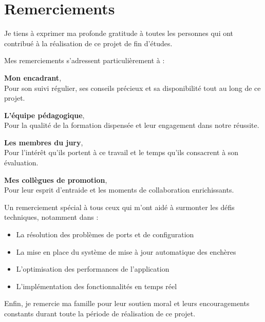 \chapter*{Remerciements}

\vspace{1cm}

Je tiens à exprimer ma profonde gratitude à toutes les personnes qui ont contribué à la réalisation de ce projet de fin d'études.

\vspace{0.5cm}

Mes remerciements s'adressent particulièrement à :

\vspace{0.5cm}

\textbf{Mon encadrant},\\
Pour son suivi régulier, ses conseils précieux et sa disponibilité tout au long de ce projet.

\vspace{0.5cm}

\textbf{L'équipe pédagogique},\\
Pour la qualité de la formation dispensée et leur engagement dans notre réussite.

\vspace{0.5cm}

\textbf{Les membres du jury},\\
Pour l'intérêt qu'ils portent à ce travail et le temps qu'ils consacrent à son évaluation.

\vspace{0.5cm}

\textbf{Mes collègues de promotion},\\
Pour leur esprit d'entraide et les moments de collaboration enrichissants.

\vspace{0.5cm}

Un remerciement spécial à tous ceux qui m'ont aidé à surmonter les défis techniques, notamment dans :
\begin{itemize}
    \item La résolution des problèmes de ports et de configuration
    \item La mise en place du système de mise à jour automatique des enchères
    \item L'optimisation des performances de l'application
    \item L'implémentation des fonctionnalités en temps réel
\end{itemize}

\vspace{0.5cm}

Enfin, je remercie ma famille pour leur soutien moral et leurs encouragements constants durant toute la période de réalisation de ce projet. 